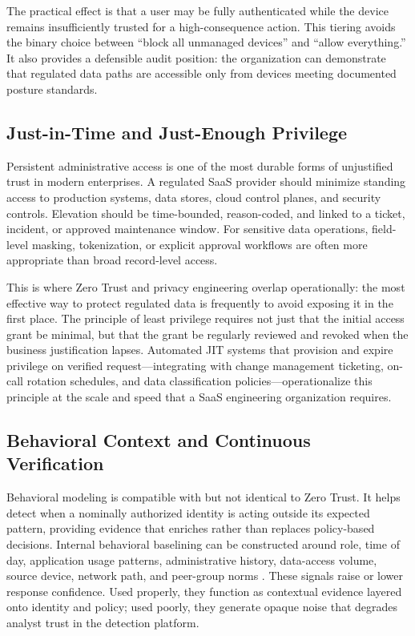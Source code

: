 \documentclass[unnumsec,webpdf,contemporary,large]{oup-authoring-template}
\theoremstyle{thmstyleone}
\theoremstyle{thmstyletwo}
\theoremstyle{thmstylethree}
\begin{document}
The practical effect is that a user may be fully authenticated while the device remains
insufficiently trusted for a high-consequence action. This tiering avoids the binary
choice between ``block all unmanaged devices'' and ``allow everything.'' It also provides
a defensible audit position: the organization can demonstrate that regulated data paths
are accessible only from devices meeting documented posture standards.

\subsection{Just-in-Time and Just-Enough Privilege}

Persistent administrative access is one of the most durable forms of unjustified trust in
modern enterprises. A regulated SaaS provider should minimize standing access to production
systems, data stores, cloud control planes, and security controls. Elevation should be
time-bounded, reason-coded, and linked to a ticket, incident, or approved maintenance
window. For sensitive data operations, field-level masking, tokenization, or explicit
approval workflows are often more appropriate than broad record-level access.

This is where Zero Trust and privacy engineering overlap operationally: the most effective
way to protect regulated data is frequently to avoid exposing it in the first place. The
principle of least privilege \cite{saltzer1975} requires not just that the initial access
grant be minimal, but that the grant be regularly reviewed and revoked when the business
justification lapses. Automated JIT systems that provision and expire privilege on verified
request---integrating with change management ticketing, on-call rotation schedules, and
data classification policies---operationalize this principle at the scale and speed that
a SaaS engineering organization requires.

\subsection{Behavioral Context and Continuous Verification}

Behavioral modeling is compatible with but not identical to Zero Trust. It helps detect
when a nominally authorized identity is acting outside its expected pattern, providing
evidence that enriches rather than replaces policy-based decisions. Internal behavioral
baselining can be constructed around role, time of day, application usage patterns,
administrative history, data-access volume, source device, network path, and peer-group
norms \cite{tuor2017}. These signals raise or lower response confidence. Used properly,
they function as contextual evidence layered onto identity and policy; used poorly, they
generate opaque noise that degrades analyst trust in the detection platform.
\end{document}
